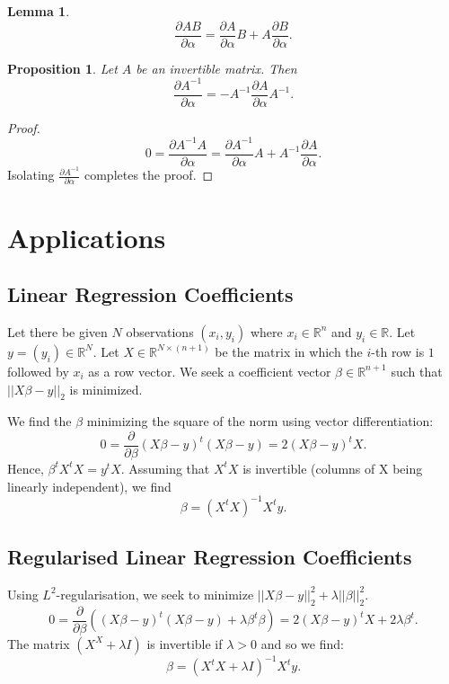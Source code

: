 \documentclass{article}
\theoremstyle{plain}
\newtheorem{lemma}[theorem]{Lemma}
\newtheorem{proposition}[theorem]{Proposition}
\newcommand{\diff}[2]{\frac{\partial {#1}}{\partial {#2}}}
\newcommand{\R}{\mathbb{R}}
\begin{document}
\begin{lemma}
\begin{equation}
\diff{AB}{\alpha} = \diff{A}{\alpha} B + A \diff{B}{\alpha}.
\end{equation}
\end{lemma}

\begin{proposition}
Let $A$ be an invertible matrix. Then
\begin{equation}
\diff{A^{-1}}{\alpha} = - A^{-1} \diff{A}{\alpha} A^{-1}.
\end{equation}
\end{proposition}
\begin{proof}
\begin{equation*}
0 = \diff{A^{-1} A}{\alpha} = \diff{A^{-1}}{\alpha} A + A^{-1} \diff{A}{\alpha}.
\end{equation*}
Isolating $\diff{A^{-1}}{\alpha}$ completes the proof.
\end{proof}


\section{Applications}
\subsection{Linear Regression Coefficients}
Let there be given $N$ observations $(x_i, y_i)$ where $x_i \in \R^n$ and $y_i \in \R$. Let $y = (y_i) \in \R^N$. Let $X \in \R^{N \times (n+1)}$ be the matrix in which the $i$-th row is $1$ followed by $x_i$ as a row vector. We seek a coefficient vector $\beta \in \R^{n+1}$ such that $\lvert\lvert X \beta - y \rvert\rvert_2$ is minimized.

We find the $\beta$ minimizing the square of the norm using vector differentiation:
\begin{equation}
0 = \diff{}{\beta} (X \beta - y)^t (X \beta - y) = 2 (X \beta - y)^t X.
\end{equation}
Hence, $\beta^t X^t X = y^t X$. Assuming that $X^t X$ is invertible (columns of X being linearly independent), we find
\begin{equation}
\beta = (X^t X)^{-1} X^t y.
\end{equation}

\subsection{Regularised Linear Regression Coefficients}
Using $L^2$-regularisation, we seek to minimize $\lvert\vert X \beta - y \rvert\rvert_2^2 + \lambda \lvert\lvert \beta \rvert\rvert_2^2$. 
\begin{equation*}
0 = \diff{}{\beta} \left( (X \beta - y)^t (X\beta - y) + \lambda \beta^t \beta \right) = 2 (X \beta - y)^t X + 2 \lambda \beta^t.
\end{equation*}
The matrix $(X^X + \lambda I)$ is invertible if $\lambda > 0$ and so we find:
\begin{equation*}
\beta = (X^t X + \lambda I)^{-1} X^t y.
\end{equation*}
\end{document}
